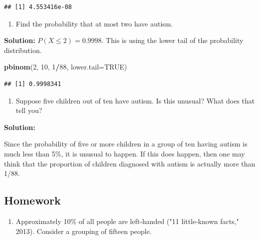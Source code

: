 \documentclass[
]{book}
\newenvironment{Shaded}{\begin{snugshade}}{\end{snugshade}}
\newcommand{\DataTypeTok}[1]{\textcolor[rgb]{0.13,0.29,0.53}{#1}}
\newcommand{\DecValTok}[1]{\textcolor[rgb]{0.00,0.00,0.81}{#1}}
\newcommand{\KeywordTok}[1]{\textcolor[rgb]{0.13,0.29,0.53}{\textbf{#1}}}
\newcommand{\NormalTok}[1]{#1}
\newcommand{\OperatorTok}[1]{\textcolor[rgb]{0.81,0.36,0.00}{\textbf{#1}}}
\newcommand{\OtherTok}[1]{\textcolor[rgb]{0.56,0.35,0.01}{#1}}
\providecommand{\tightlist}{%
  \setlength{\itemsep}{0pt}\setlength{\parskip}{0pt}}
\begin{document}
\begin{verbatim}
## [1] 4.553416e-08
\end{verbatim}

\begin{enumerate}
\def\labelenumi{\alph{enumi}.}
\setcounter{enumi}{5}
\tightlist
\item
  Find the probability that at most two have autism.
\end{enumerate}

\textbf{Solution:}
\(P(X \le 2)=0.9998\). This is using the lower tail of the probability distribution.

\begin{Shaded}
\begin{Highlighting}[]
\KeywordTok{pbinom}\NormalTok{(}\DecValTok{2}\NormalTok{, }\DecValTok{10}\NormalTok{, }\DecValTok{1}\OperatorTok{/}\DecValTok{88}\NormalTok{, }\DataTypeTok{lower.tail=}\OtherTok{TRUE}\NormalTok{)}
\end{Highlighting}
\end{Shaded}

\begin{verbatim}
## [1] 0.9998341
\end{verbatim}

\begin{enumerate}
\def\labelenumi{\alph{enumi}.}
\setcounter{enumi}{6}
\tightlist
\item
  Suppose five children out of ten have autism. Is this unusual? What does that tell you?
\end{enumerate}

\textbf{Solution:}

Since the probability of five or more children in a group of ten having autism is much less than 5\%, it is unusual to happen. If this does happen, then one may think that the proportion of children diagnosed with autism is actually more than 1/88.

\hypertarget{homework-11}{%
\subsection{Homework}\label{homework-11}}

\begin{enumerate}
\def\labelenumi{\arabic{enumi}.}
\tightlist
\item
  Approximately 10\% of all people are left-handed ("11 little-known facts," 2013). Consider a grouping of fifteen people.
\end{enumerate}
\end{document}
